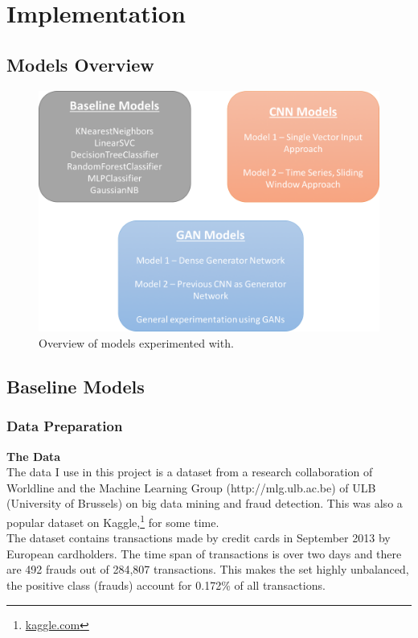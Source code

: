 \documentclass[12pt,a4paper,twoside]{report}
\begin{document}
\chapter{Implementation}
\section{Models Overview}

\begin{figure}[H]
\centering
\includegraphics[scale=0.8]{models_overview_3}
\caption{Overview of models experimented with.}
\label{fig:models_overview}
\end{figure}

\section{Baseline Models}
\subsection{Data Preparation}

\textbf{The Data}\\

The data I use in this project is a dataset from a research collaboration of Worldline and the Machine Learning Group (http://mlg.ulb.ac.be) of ULB (University of Brussels) on big data mining and fraud detection. This was also a popular dataset on Kaggle,\footnote{\href{kaggle.com}{kaggle.com}} for some time.\\
The dataset contains transactions made by credit cards in September 2013 by European cardholders. The time span of transactions is over two days and there are 492 frauds out of 284,807 transactions. This makes the set highly unbalanced, the positive class (frauds) account for 0.172\% of all transactions.
 
\end{document}
